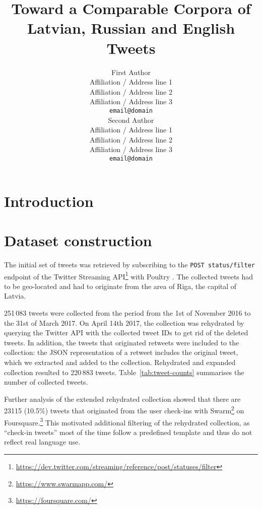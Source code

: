 \documentclass[11pt,a4paper]{article}
\title{Toward a Comparable Corpora of Latvian, Russian and English Tweets}
\author{First Author \\
  Affiliation / Address line 1 \\
  Affiliation / Address line 2 \\
  Affiliation / Address line 3 \\
  {\tt email@domain} \\\And
  Second Author \\
  Affiliation / Address line 1 \\
  Affiliation / Address line 2 \\
  Affiliation / Address line 3 \\
  {\tt email@domain} \\}
\date{}
\begin{document}
\maketitle
\begin{abstract}
\end{abstract}

\section{Introduction}
\label{sec:introduction}

\section{Dataset construction}
\label{sec:construction}



The initial set of tweets was retrieved by subscribing to the \texttt{POST status/filter} endpoint of the Twitter Streaming API\footnote{\url{https://dev.twitter.com/streaming/reference/post/statuses/filter}} with Poultry \cite{dmitrijs_milajevs_2017_546609}. The collected tweets had to be geo-located and had to originate from the area of Riga, the capital of Latvia.\footnotemark{}


251\,083 tweets were collected from the period from the 1st of November 2016 to the 31st of March 2017. On April 14th 2017, the collection was rehydrated by querying the Twitter API with the collected tweet IDs to get rid of the deleted tweets. In addition, the tweets that originated retweets were included to the collection: the JSON representation of a retweet includes the original tweet, which we extracted and added to the collection. Rehydrated and expanded collection resulted to 220\,883 tweets. Table~\ref{tab:tweet-counts} summarises the number of collected tweets. 



Further analysis of the extended rehydrated collection showed that there are 23115 (10.5\%) tweets that originated from the user check-ins with Swarm\footnote{\url{https://www.swarmapp.com/}} on Foursquare.\footnote{\url{https://foursquare.com/}} This motivated additional filtering of the rehydrated collection, as ``check-in tweets'' most of the time follow a predefined template and thus do not reflect real language use. 
\end{document}
